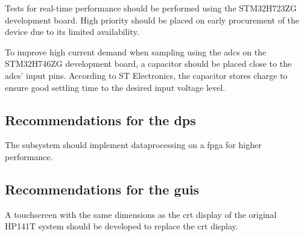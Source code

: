 \documentclass[class=report,11pt,crop=false]{standalone}
\begin{document}
Tests for real-time performance should be performed using the STM32H723ZG development board. High priority should be placed on early procurement of the device due to its limited availability.

To improve high current demand when sampling using the \acrshort{adc}s on the STM32H746ZG development board, a capacitor should be placed close to the \acrshort{adc}s' input pins. According to ST Electronics, the capacitor stores charge to ensure good settling time to the desired input voltage level.   

\subsection{Recommendations for the \acrlong{dps}}

The subsystem should implement dataprocessing on a \acrshort{fpga} for higher performance. 

\subsection{Recommendations for the \acrshort{guis}}

A touchscreen with the same dimensions as the \acrshort{crt} display of the original HP141T system should be developed to replace the \acrshort{crt} display. 
\ifstandalone

\printnoidxglossary[type=\acronymtype,nonumberlist]
\fi
\end{document}
